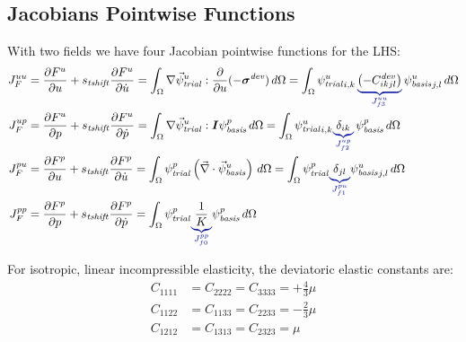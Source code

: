 \subsection{Jacobians Pointwise Functions}

With two fields we have four Jacobian pointwise functions for the LHS:
\begin{align}
  J_F^{uu} &= \frac{\partial F^u}{\partial u} + s_\mathit{tshift} \frac{\partial F^u}{\partial \dot{u}} =
             \int_\Omega \nabla \trialvec[u] : \frac{\partial}{\partial u}(-\tensor{\sigma}^\mathit{dev}) \, d\Omega 
             = \int_\Omega \trialscalar[u]_{i,k} \, \eqnannotate{\left(-C^\mathit{dev}_{ikjl}\right)} {J_{f3}^{uu}}  \, \basisscalar[u]_{j,l}\, d\Omega \\
  J_F^{up} &= \frac{\partial F^u}{\partial p} + s_\mathit{tshift} \frac{\partial F^u}{\partial \dot{p}} =
             \int_\Omega \nabla\trialvec[u] : \tensor{I} \basisscalar[p] \,  d\Omega
             = \int_\Omega \trialscalar[u]_{i,k} \eqnannotate{\delta_{ik}}{J_{f2}^{up}} \, \basisscalar[p] \, d\Omega \\
  J_F^{pu} &= \frac{\partial F^p}{\partial u} + s_\mathit{tshift} \frac{\partial F^p}{\partial \dot{u}} =
             \int_\Omega \trialscalar[p] \left(\vec{\nabla}  \cdot \basisvec[u]\right) \, d\Omega
             = \int_\Omega \trialscalar[p] \eqnannotate{\delta_{jl}}{J_{f1}^{pu}} \basisscalar[u]_{j,l} \, d\Omega\\
  J_F^{pp} &= \frac{\partial F^p}{\partial p}  + s_\mathit{tshift} \frac{\partial F^p}{\partial \dot{p}} =
             \int_\Omega \trialscalar[p] \eqnannotate{\frac{1} {K}}{J_{f0}^{pp}} \basisscalar[p] \, d\Omega
\end{align}

For isotropic, linear incompressible elasticity, the deviatoric elastic constants are:
\begin{align}
    C_{1111} &= C_{2222} = C_{3333} = +\frac{4}{3} \mu \\
    C_{1122} &= C_{1133} = C_{2233} = -\frac{2}{3} \mu \\
    C_{1212} &= C_{1313} = C_{2323} = \mu
\end{align}
